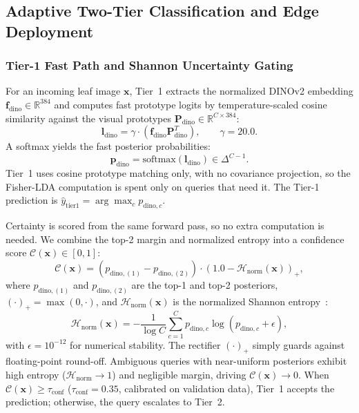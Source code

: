 \documentclass[preprint,12pt]{elsarticle}
\begin{document}
\subsection{Adaptive Two-Tier Classification and Edge Deployment}
\label{sec:edge_cascade}

\subsubsection{Tier-1 Fast Path and Shannon Uncertainty Gating}
For an incoming leaf image $\mathbf{x}$, Tier~1 extracts the normalized DINOv2 embedding $\mathbf{f}_{\text{dino}} \in \mathbb{R}^{384}$ and computes fast prototype logits by temperature-scaled cosine similarity against the visual prototypes $\mathbf{P}_{\text{dino}} \in \mathbb{R}^{C \times 384}$:
\begin{equation}
    \label{eq:tier1_logits}
    \mathbf{l}_{\text{dino}} = \gamma \cdot \left(\mathbf{f}_{\text{dino}} \mathbf{P}_{\text{dino}}^T\right), \qquad \gamma = 20.0.
\end{equation}
A softmax yields the fast posterior probabilities:
\begin{equation}
    \label{eq:tier1_softmax}
    \mathbf{p}_{\text{dino}} = \text{softmax}(\mathbf{l}_{\text{dino}}) \in \Delta^{C-1}.
\end{equation}
Tier~1 uses cosine prototype matching only, with no covariance projection, so the Fisher-LDA computation is spent only on queries that need it. The Tier-1 prediction is $\hat{y}_{\text{tier1}} = \arg\max_c p_{\text{dino}, c}$.

Certainty is scored from the same forward pass, so no extra computation is needed. We combine the top-2 margin and normalized entropy into a confidence score $\mathcal{C}(\mathbf{x}) \in [0, 1]$:
\begin{equation}
    \label{eq:shannon_gate}
    \mathcal{C}(\mathbf{x}) = \left(p_{\text{dino}, (1)} - p_{\text{dino}, (2)}\right) \cdot \left(1.0 - \mathcal{H}_{\text{norm}}(\mathbf{x})\right)_+,
\end{equation}
where $p_{\text{dino}, (1)}$ and $p_{\text{dino}, (2)}$ are the top-1 and top-2 posteriors, $(\cdot)_+ = \max(0, \cdot)$, and $\mathcal{H}_{\text{norm}}(\mathbf{x})$ is the normalized Shannon entropy~\cite{shannon1948mathematical}:
\begin{equation}
    \mathcal{H}_{\text{norm}}(\mathbf{x}) = -\frac{1}{\log C}\sum_{c=1}^C p_{\text{dino}, c}\log(p_{\text{dino}, c} + \epsilon),
\end{equation}
with $\epsilon = 10^{-12}$ for numerical stability. The rectifier $(\cdot)_+$ simply guards against floating-point round-off. Ambiguous queries with near-uniform posteriors exhibit high entropy ($\mathcal{H}_{\text{norm}} \to 1$) and negligible margin, driving $\mathcal{C}(\mathbf{x}) \to 0$. When $\mathcal{C}(\mathbf{x}) \ge \tau_{\text{conf}}$ ($\tau_{\text{conf}} = 0.35$, calibrated on validation data), Tier~1 accepts the prediction; otherwise, the query escalates to Tier~2.
\end{document}
